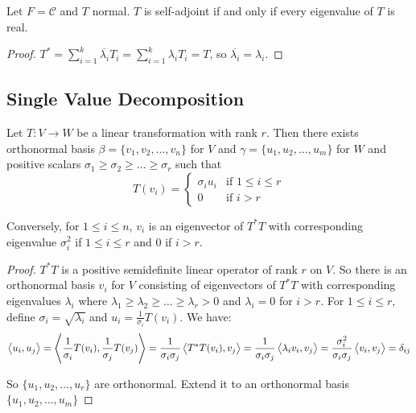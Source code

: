 \begin{theorem}
    Let $F=\mathcal{C}$ and $T$ normal. $T$ is self-adjoint if and only if every eigenvalue of $T$ is real.    
\end{theorem}
\begin{proof}
    $\displaystyle T^* = \sum_{i=1}^k \overline{\lambda_i} T_i = \sum_{i=1}^k \lambda_i T_i = T$, so $\overline{\lambda_i} = \lambda_i$.
\end{proof}



\subsection{Single Value Decomposition}

\begin{theorem}
    Let $T:V \rightarrow W$ be a linear transformation with rank $r$. Then there exists orthonormal basis $\beta = \{v_1, v_2, \dots, v_n \}$ for $V$ and $\gamma = \{ u_1, u_2, \dots, u_m \}$ for $W$ and positive scalars  $\sigma_1 \geq \sigma_2 \geq \dots \geq \sigma_r$ such that
    \begin{equation}
        T(v_i) = \begin{cases}
            \sigma_i u_i & \text{if } 1 \leq i \leq r \\
            0 & \text{if } i > r
        \end{cases}
    \end{equation}
    
    Conversely, for $1 \leq i \leq n$, $v_i$ is an eigenvector of $T^*T$ with corresponding eigenvalue $\sigma_i^2$ if $1 \leq i \leq r$ and $0$ if $i > r$. 
\end{theorem}
\begin{proof}
    $T^*T$ is a positive semidefinite linear operator of rank $r$ on $V$. So there is an orthonormal basis $v_i$ for $V$ consisting of eigenvectors of $T^*T$ with corresponding eigenvalues $\lambda_i$ where $\lambda_1 \geq \lambda_2 \geq \dots \geq \lambda_r > 0$ and $\lambda_i = 0$ for $i > r$. For $1 \leq i \leq r$, define $\sigma_i = \sqrt{\lambda_i}$ and $\displaystyle u_i = \frac{1}{\sigma_i} T(v_i)$. We have:
    \begin{equation*}
    \left\langle \displaystyle u_i, u_j \right\rangle = \left\langle \displaystyle \frac{1}{\sigma_i} T(v_i), \frac{1}{\sigma_j} T(v_j) \right\rangle = \frac{1}{\sigma_i \sigma_j} \left\langle \displaystyle T^*T(v_i), v_j \right\rangle = \frac{1}{\sigma_i \sigma_j} \left\langle \displaystyle \lambda_i v_i, v_j \right\rangle = \frac{\sigma_i^2}{\sigma_i \sigma_j} \left\langle \displaystyle v_i, v_j \right\rangle = \delta_{ij}
    \end{equation*}
    
    So $\{u_1, u_2, \dots, u_r \}$ are orthonormal. Extend it to an orthonormal basis $\{u_1, u_2, \dots, u_m \}$
\end{proof}

